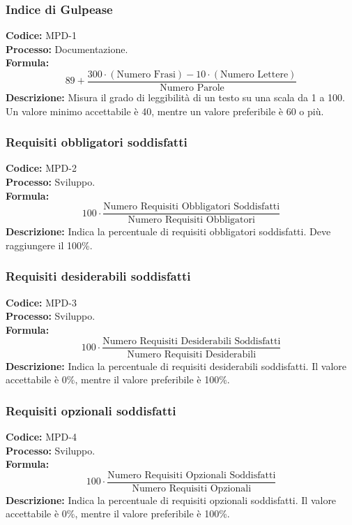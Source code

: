 \subsubsection{Indice di Gulpease}
\textbf{Codice:} MPD-1 \\
\textbf{Processo:} Documentazione. \\
\textbf{Formula:}
\[
89 + \frac{300 \cdot (\text{Numero Frasi}) - 10 \cdot (\text{Numero Lettere})}{\text{Numero Parole}}
\]
\textbf{Descrizione:} Misura il grado di leggibilità di un testo su una scala da 1 a 100. Un valore minimo accettabile è 40, mentre un valore preferibile è 60 o più.

\subsubsection{Requisiti obbligatori soddisfatti}
\textbf{Codice:} MPD-2 \\
\textbf{Processo:} Sviluppo. \\
\textbf{Formula:}
\[
100 \cdot \frac{\text{Numero Requisiti Obbligatori Soddisfatti}}{\text{Numero Requisiti Obbligatori}}
\]
\textbf{Descrizione:} Indica la percentuale di requisiti obbligatori soddisfatti. Deve raggiungere il 100\%.

\subsubsection{Requisiti desiderabili soddisfatti}
\textbf{Codice:} MPD-3 \\
\textbf{Processo:} Sviluppo. \\
\textbf{Formula:}
\[
100 \cdot \frac{\text{Numero Requisiti Desiderabili Soddisfatti}}{\text{Numero Requisiti Desiderabili}}
\]
\textbf{Descrizione:} Indica la percentuale di requisiti desiderabili soddisfatti. Il valore accettabile è 0\%, mentre il valore preferibile è 100\%.

\subsubsection{Requisiti opzionali soddisfatti}
\textbf{Codice:} MPD-4 \\
\textbf{Processo:} Sviluppo. \\
\textbf{Formula:}
\[
100 \cdot \frac{\text{Numero Requisiti Opzionali Soddisfatti}}{\text{Numero Requisiti Opzionali}}
\]
\textbf{Descrizione:} Indica la percentuale di requisiti opzionali soddisfatti. Il valore accettabile è 0\%, mentre il valore preferibile è 100\%.


